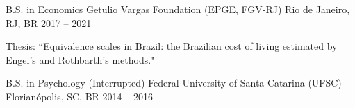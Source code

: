 


\begin{cventries}


\cventry
{B.S. in Economics} %
{Getulio Vargas Foundation (EPGE, FGV‑RJ)} %
{Rio de Janeiro, RJ, BR} %
{2017 -- 2021} %
{ %
\begin{cvitems}
\item {Thesis: ``Equivalence scales in Brazil: the Brazilian cost of living estimated by Engel’s and Rothbarth’s methods."}
\end{cvitems}
}

\cventry
{B.S. in Psychology (Interrupted)} %
{Federal University of Santa Catarina (UFSC)} %
{Florianópolis, SC, BR} %
{2014 -- 2016} %
{ %
}


\end{cventries}